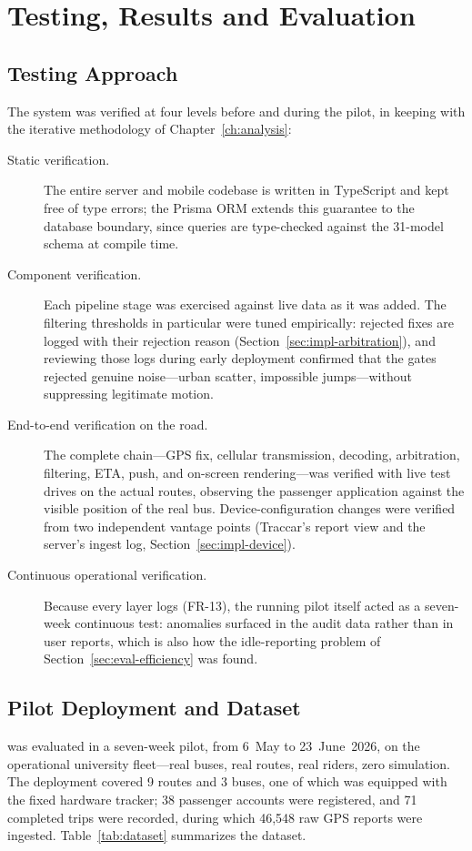 \chapter{Testing, Results and Evaluation}
\label{ch:evaluation}

\section{Testing Approach}
\label{sec:eval-testing}
The system was verified at four levels before and during the pilot, in
keeping with the iterative methodology of Chapter~\ref{ch:analysis}:

\begin{description}
  \item[Static verification.] The entire server and mobile codebase is
  written in TypeScript and kept free of type errors; the Prisma ORM
  extends this guarantee to the database boundary, since queries are
  type-checked against the 31-model schema at compile time.
  \item[Component verification.] Each pipeline stage was exercised
  against live data as it was added. The filtering thresholds in
  particular were tuned empirically: rejected fixes are logged with
  their rejection reason (Section~\ref{sec:impl-arbitration}), and
  reviewing those logs during early deployment confirmed that the gates
  rejected genuine noise---urban scatter, impossible jumps---without
  suppressing legitimate motion.
  \item[End-to-end verification on the road.] The complete chain---GPS
  fix, cellular transmission, decoding, arbitration, filtering, ETA,
  push, and on-screen rendering---was verified with live test drives on
  the actual routes, observing the passenger application against the
  visible position of the real bus. Device-configuration changes were
  verified from two independent vantage points (Traccar's report view
  and the server's ingest log, Section~\ref{sec:impl-device}).
  \item[Continuous operational verification.] Because every layer logs
  (FR-13), the running pilot itself acted as a seven-week continuous
  test: anomalies surfaced in the audit data rather than in user
  reports, which is also how the idle-reporting problem of
  Section~\ref{sec:eval-efficiency} was found.
\end{description}

\section{Pilot Deployment and Dataset}
\label{sec:eval-dataset}
\system{} was evaluated in a seven-week pilot, from 6~May to
23~June~2026, on the operational university fleet---real buses, real
routes, real riders, zero simulation. The deployment covered 9 routes
and 3 buses, one of which was equipped with the fixed hardware tracker;
38 passenger accounts were registered, and 71 completed trips were
recorded, during which 46{,}548 raw GPS reports were ingested.
Table~\ref{tab:dataset} summarizes the dataset.


